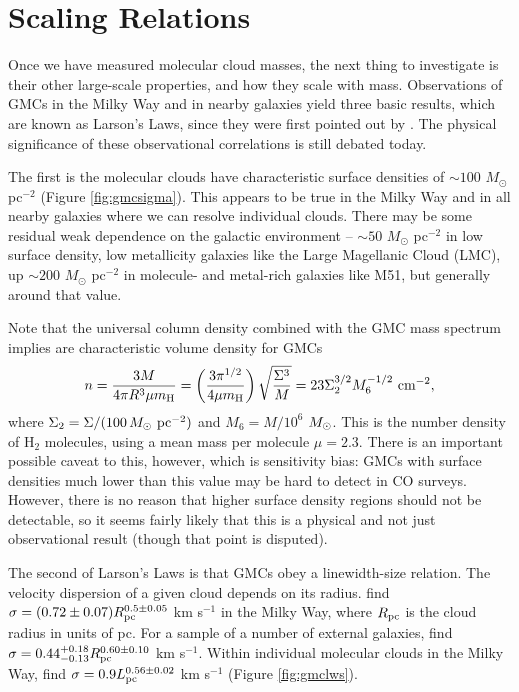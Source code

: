 \section{Scaling Relations}

Once we have measured molecular cloud masses, the next thing to investigate is their other large-scale properties, and how they scale with mass. Observations of GMCs in the Milky Way and in nearby galaxies yield three basic results, which are known as Larson's Laws, since they were first pointed out by \citet{larson81a}. The physical significance of these observational correlations is still debated today.

The first is the molecular clouds have characteristic surface densities of $\sim 100$ $M_\odot$ pc$^{-2}$ (Figure \ref{fig:gmcsigma}). This appears to be true in the Milky Way and in all nearby galaxies where we can resolve individual clouds. There may be some residual weak dependence on the galactic environment -- $\sim 50$ $M_\odot$ pc$^{-2}$ in low surface density, low metallicity galaxies like the Large Magellanic Cloud (LMC), up $\sim 200$ $M_\odot$ pc$^{-2}$ in molecule- and metal-rich galaxies like M51, but generally around that value.

Note that the universal column density combined with the GMC mass spectrum implies are characteristic volume density for GMCs
\begin{equation}
n = \frac{3M}{4\pi R^3\mu m_{\rm H}} = \left(\frac{3\pi^{1/2}}{4\mu m_{\rm H}}\right) \sqrt{\frac{\Sigma^3}{M}} = 23 \Sigma_2^{3/2} M_6^{-1/2}\mbox{ cm}^{-2},
\end{equation}
where $\Sigma_2 = \Sigma/(100\,M_{\odot}\mbox{ pc}^{-2})$ and $M_6=M/10^6$ $M_{\odot}$. This is the number density of H$_2$ molecules, using a mean mass per molecule $\mu=2.3$. There is an important possible caveat to this, however, which is sensitivity bias: GMCs with surface densities much lower than this value may be hard to detect in CO surveys. However, there is no reason that higher surface density regions should not be detectable, so it seems fairly likely that this is a physical and not just observational result (though that point is disputed).

The second of Larson's Laws is that GMCs obey a linewidth-size relation. The velocity dispersion of a given cloud depends on its radius. \citet{solomon87a} find $\sigma = (0.72\pm 0.07)R_{\rm pc}^{0.5\pm 0.05}$ km s$^{-1}$ in the Milky Way, where $R_{\rm pc}$ is the cloud radius in units of pc. For a sample of a number of external galaxies, \citet{bolatto08a} find $\sigma = 0.44^{+0.18}_{-0.13} R_{\rm pc}^{0.60\pm 0.10}$ km s$^{-1}$. Within individual molecular clouds in the Milky Way, \citet{heyer04a} find $\sigma=0.9 L_{\rm pc}^{0.56\pm 0.02}$ km s$^{-1}$ (Figure \ref{fig:gmclws}).

